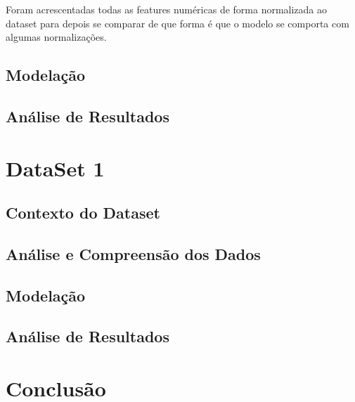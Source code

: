 \documentclass[a4paper,10pt]{article}
\begin{document}
Foram acrescentadas todas as features numéricas de forma normalizada ao dataset para depois se comparar de que forma é que o modelo se comporta com algumas normalizações. 




\newpage
\subsection{Modelação}
\subsection{Análise de Resultados}



\newpage
\section{DataSet 1}
\subsection{Contexto do Dataset}
\subsection{Análise e Compreensão dos Dados}
\subsection{Modelação}
\subsection{Análise de Resultados}
\section{Conclusão}
\end{document}
